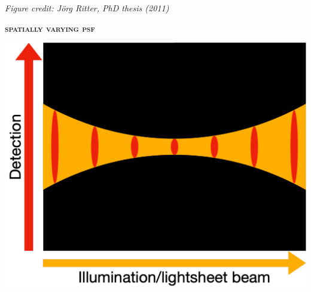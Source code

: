 \documentclass[a0paper,portrait,fontscale=0.35]{baposter}
\newcommand{\mycaption}[1]{
  {
    \smaller
    \emph{#1}
  }
}
\theoremstyle{plain}
\theoremstyle{plain}
\theoremstyle{definition}
\theoremstyle{plain}
\theoremstyle{definition}
\begin{document}
\begin{poster}
{\begin{minipage}[t]{0.48\textwidth}
    \mycaption{Figure credit: J\"{o}rg Ritter, PhD thesis (2011)}
  \end{minipage}
  \begin{minipage}[t]{0.48\textwidth}
    \begin{center}
      \larger
      {\color{blue}\textbf{\textsc{spatially varying psf}}}\\
    \end{center}
    
    \begin{minipage}[t]{\textwidth}
      \centering
      \includegraphics[width=\textwidth]{img/psf_vary.pdf}
    \end{minipage}
  \end{minipage}
     
}
\end{poster}
\end{document}
